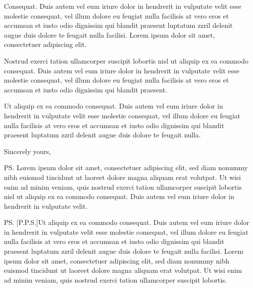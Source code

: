 \documentclass{hmcletter}
\begin{document}
Consequat. Duis autem vel eum iriure dolor in hendrerit in
vulputate velit esse molestie consequat, vel illum dolore eu
feugiat nulla facilisis at vero eros et accumsan et iusto odio
dignissim qui blandit praesent luptatum zzril delenit augue duis
dolore te feugait nulla facilisi. Lorem ipsum dolor sit amet,
consectetuer adipiscing elit.

Nostrud exerci tation ullamcorper suscipit lobortis nisl ut
aliquip ex ea commodo consequat. Duis autem vel eum iriure dolor
in hendrerit in vulputate velit esse molestie consequat, vel illum
dolore eu feugiat nulla facilisis at vero eros et accumsan et
iusto odio dignissim qui blandit praesent.

Ut aliquip ex ea commodo consequat. Duis autem vel eum iriure
dolor in hendrerit in vulputate velit esse molestie consequat, vel
illum dolore eu feugiat nulla facilisis at vero eros et accumsan
et iusto odio dignissim qui blandit praesent luptatum zzril
delenit augue duis dolore te feugait nulla.


\closing{Sincerely yours,}


\ps{Lorem ipsum dolor sit amet, consectetuer adipiscing elit, sed
  diam nonummy nibh euismod tincidunt ut laoreet dolore magna
  aliquam erat volutpat. Ut wisi enim ad minim veniam, quis
  nostrud exerci tation ullamcorper suscipit lobortis nisl ut
  aliquip ex ea commodo consequat. Duis autem vel eum iriure dolor
  in hendrerit in vulputate velit.}

\ps[P.P.S.]{Ut aliquip ex ea commodo consequat. Duis autem vel eum iriure
dolor in hendrerit in vulputate velit esse molestie consequat, vel
illum dolore eu feugiat nulla facilisis at vero eros et accumsan
et iusto odio dignissim qui blandit praesent luptatum zzril
delenit augue duis dolore te feugait nulla facilisi. Lorem ipsum
dolor sit amet, consectetuer adipiscing elit, sed diam nonummy
nibh euismod tincidunt ut laoreet dolore magna aliquam erat
volutpat. Ut wisi enim ad minim veniam, quis nostrud exerci tation
ullamcorper suscipit lobortis.}







%
\end{document}
